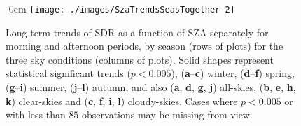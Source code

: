 \begin{figure}[h!]
    \begin{adjustwidth}{-\extralength}{0cm}
        {\centering
            \texttt{[image: ./images/SzaTrendsSeasTogether-2]}
        }
    \end{adjustwidth}
    \caption{Long-term trends of SDR as a function of SZA separately for morning
           and afternoon periods, by season (rows of plots) for the three sky
           conditions (columns of plots).
           Solid shapes represent statistical significant trends ($p<0.005$), (\textbf{a}--\textbf{c}) winter, (\textbf{d}--\textbf{f}) spring, (\textbf{g}--\textbf{i}) summer, (\textbf{j}--\textbf{l}) autumn, and also (\textbf{a}, \textbf{d}, \textbf{g}, \textbf{j}) all-skies, (\textbf{b}, \textbf{e}, \textbf{h}, \textbf{k}) clear-skies and (\textbf{c}, \textbf{f}, \textbf{i}, \textbf{l}) cloudy-skies.
           Cases where $p<0.005$ or with less than $85$ observations may be
           missing from view.}\label{fig:SZAtrendSeason}
\end{figure}




\FloatBarrier

%
